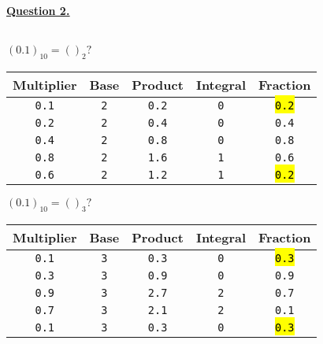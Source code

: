 \documentclass[12pt]{article}
\begin{document}
\newpage
\noindent \hyperlink{toc}{\hypertarget{2}{\LARGE \underline{\textbf{Question 2.}}}}\\\\
\begin{minipage}[t]{0.5\textwidth}
	$(0.1)_{10} = ()_2?$
	\begin{center}
		\begin{tabular}{|c|c|c|c|c|}
			\hline \cellcolor{gray!25}Multiplier &
			\cellcolor{gray!25}Base &
			\cellcolor{gray!25}Product &
			\cellcolor{gray!25}Integral &
			\cellcolor{gray!25}Fraction \\
			\hline\hline
			\texttt{0.1} & \texttt{2} & \texttt{0.2} & \texttt{0} & \hl{\texttt{0.2}} \\\hline
			\texttt{0.2} & \texttt{2} & \texttt{0.4} & \texttt{0} & \texttt{0.4} \\\hline
			\texttt{0.4} & \texttt{2} & \texttt{0.8} & \texttt{0} & \texttt{0.8} \\\hline
			\texttt{0.8} & \texttt{2} & \texttt{1.6} & \texttt{1} & \texttt{0.6} \\\hline
			\texttt{0.6} & \texttt{2} & \texttt{1.2} & \texttt{1} & \hl{\texttt{0.2}} \\\hline
		\end{tabular}
	\end{center}
	$(0.1)_{10} = ()_3?$
	\begin{center}
		\begin{tabular}{|c|c|c|c|c|}
			\hline \cellcolor{gray!25}Multiplier &
			\cellcolor{gray!25}Base &
			\cellcolor{gray!25}Product &
			\cellcolor{gray!25}Integral &
			\cellcolor{gray!25}Fraction \\
			\hline\hline
			\texttt{0.1} & \texttt{3} & \texttt{0.3} & \texttt{0} & \hl{\texttt{0.3}} \\\hline
			\texttt{0.3} & \texttt{3} & \texttt{0.9} & \texttt{0} & \texttt{0.9} \\\hline
			\texttt{0.9} & \texttt{3} & \texttt{2.7} & \texttt{2} & \texttt{0.7} \\\hline
			\texttt{0.7} & \texttt{3} & \texttt{2.1} & \texttt{2} & \texttt{0.1} \\\hline
			\texttt{0.1} & \texttt{3} & \texttt{0.3} & \texttt{0} & \hl{\texttt{0.3}} \\\hline
		\end{tabular}

\end{center}
\end{minipage}
\end{document}
